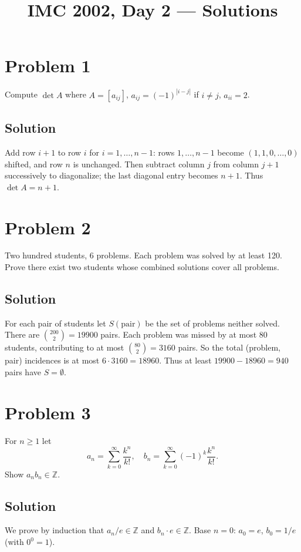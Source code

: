 \documentclass{article}
\title{IMC 2002, Day 2 --- Solutions}
\begin{document}
\maketitle

\section*{Problem 1}
Compute $\det A$ where $A=[a_{ij}]$, $a_{ij}=(-1)^{|i-j|}$ if $i\ne j$, $a_{ii}=2$.

\subsection*{Solution}
Add row $i+1$ to row $i$ for $i=1,\dots,n-1$: rows $1,\dots,n-1$ become $(1,1,0,\dots,0)$ shifted, and row $n$ is unchanged. Then subtract column $j$ from column $j+1$ successively to diagonalize; the last diagonal entry becomes $n+1$. Thus $\det A = n+1$.

\section*{Problem 2}
Two hundred students, 6 problems. Each problem was solved by at least 120. Prove there exist two students whose combined solutions cover all problems.

\subsection*{Solution}
For each pair of students let $S(\text{pair})$ be the set of problems neither solved. There are $\binom{200}{2}=19900$ pairs. Each problem was missed by at most $80$ students, contributing to at most $\binom{80}{2}=3160$ pairs. So the total (problem, pair) incidences is at most $6\cdot 3160 = 18960$. Thus at least $19900-18960 = 940$ pairs have $S=\emptyset$.

\section*{Problem 3}
For $n\ge 1$ let
\[a_n = \sum_{k=0}^\infty \frac{k^n}{k!},\quad b_n = \sum_{k=0}^\infty (-1)^k\frac{k^n}{k!}.\]
Show $a_n b_n\in\mathbb{Z}$.

\subsection*{Solution}
We prove by induction that $a_n/e\in\mathbb{Z}$ and $b_n\cdot e\in\mathbb{Z}$. Base $n=0$: $a_0=e$, $b_0=1/e$ (with $0^0=1$).
\end{document}
